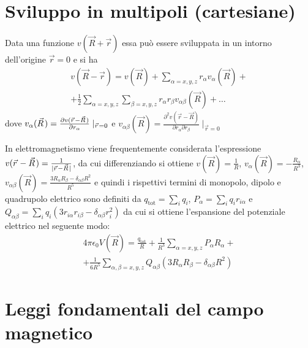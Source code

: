 \documentclass[a4paper,10pt]{article}
\begin{document}
\begin{multicols}{2}
\section{Sviluppo in multipoli (cartesiane)}
Data una funzione $v(\vec R + \vec r)$ essa può essere sviluppata in un
intorno dell'origine $\vec r = 0$ e si ha
\begin{align*}
  v(\vec R - \vec r) = v(\vec R) + \sum_{\alpha = x,y,z} r_\alpha v_\alpha(\vec R) + \\
  + \frac{1}{2} \sum_{\alpha = x,y,z} \sum_{\beta = x,y,z} r_\alpha r_\beta v_{\alpha \beta}(\vec R) + \ldots
\end{align*}
dove $v_\alpha(\vec R) = \dep{v(\vec r - \vec R)}{r_\alpha}\mid_{\vec r = 0}$
e $v_{\alpha\beta}(\vec R) = \frac{\partial^2 v(\vec r - \vec R)}{\partial r_\alpha \partial r_\beta} \mid_{\vec r = 0}$

In elettromagnetismo viene frequentemente considerata l'espressione $v(\vec r - \vec R) = \frac{1}{\abs{\vec r - \vec R}}$,
da cui differenziando si ottiene $v(\vec R) = \frac{1}{R}$, $v_\alpha(\vec R) = -\frac{R_\alpha}{R^3}$,
$v_{\alpha\beta}(\vec R) = \frac{3 R_\alpha R_\beta - \delta_{\alpha\beta} R^2}{R^5}$ e quindi i rispettivi termini di monopolo,
dipolo e quadrupolo elettrico sono definiti da $q_\text{tot} = \sum_i q_i$, $P_\alpha = \sum_i q_i r_{i\alpha}$ e
$Q_{\alpha\beta} = \sum_i q_i (3r_{i\alpha}r_{i\beta} - \delta_{\alpha\beta} r_i^2)$ da cui si ottiene l'espansione del potenziale
elettrico nel seguente modo:
\begin{align*}
  4\pi\epsilon_0 V(\vec R) = \frac{q_\text{tot}}{R} + \frac{1}{R^3} \sum_{\alpha = x,y,z} P_\alpha R_\alpha + \\
  + \frac{1}{6 R^5} \sum_{\alpha, \beta = x,y,z} Q_{\alpha\beta} (3R_\alpha R_\beta - \delta_{\alpha\beta} R^2)
\end{align*}

\section{Leggi fondamentali del campo magnetico}



\end{multicols}
\end{document}
